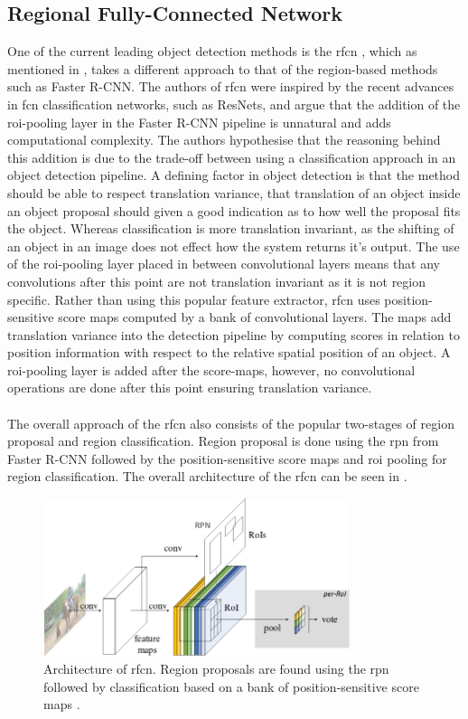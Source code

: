 \subsection{Regional Fully-Connected Network}
One of the current leading object detection methods is the \gls{rfcn} \cite{rfcn}, which as mentioned in , takes a different approach to that of the region-based methods such as Faster R-CNN. The authors of \gls{rfcn} were inspired by the recent advances in \gls{fcn} classification networks, such as ResNets, and argue that the addition of the \gls{roi}-pooling layer in the Faster R-CNN pipeline is unnatural and adds computational complexity. The authors hypothesise that the reasoning behind this addition is due to the trade-off between using a classification approach in an object detection pipeline. A defining factor in object detection is that the method should be able to respect translation variance, that translation of an object inside an object proposal should given a good indication as to how well the proposal fits the object. Whereas classification is more translation invariant, as the shifting of an object in an image does not effect how the system returns it's output. The use of the \gls{roi}-pooling layer placed in between convolutional layers means that any convolutions after this point are not translation invariant as it is not region specific. Rather than using this popular feature extractor, \gls{rfcn} uses position-sensitive score maps computed by a bank of convolutional layers. The maps add translation variance into the detection pipeline by computing scores in relation to position information with respect to the relative spatial position of an object. A \gls{roi}-pooling layer is added after the score-maps, however, no convolutional operations are done after this point ensuring translation variance.
\\\\
The overall approach of the \gls{rfcn} also consists of the popular two-stages of region proposal and region classification. Region proposal is done using the \gls{rpn} from Faster R-CNN followed by the position-sensitive score maps and \gls{roi} pooling for region classification. The overall architecture of the \gls{rfcn} can be seen in .


\begin{figure}[H]
  \centering
    \includegraphics[width=0.8\textwidth]{Figs/Techanal/rfcnarchi.png}
      \caption{Architecture of \gls{rfcn}. Region proposals are found using the \gls{rpn} followed by classification based on a bank of position-sensitive score maps \cite{rfcn}.}
    \label{fig:rfcnarch}
\end{figure}

